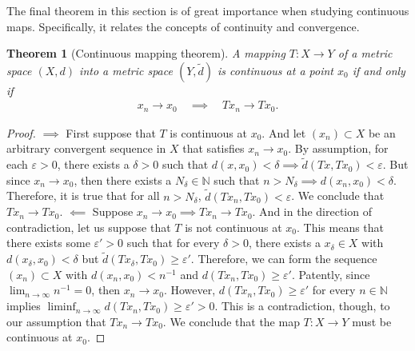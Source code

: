 \documentclass[11pt]{article}
\theoremstyle{mystyle}
\newtheorem{thm}{Theorem}[section]
\begin{document}
The final theorem in this section is of great importance when studying continuous maps. Specifically, it relates the concepts of continuity and convergence.
\begin{thm}[Continuous mapping theorem]\label{continuousmapping}
A mapping $T: X \longrightarrow Y$ of a metric space $(X, d)$ into a metric space $(Y, \tilde{d})$ is continuous at a point $x_0$ if and only if
\begin{align*}
    x_n \longrightarrow x_0 \quad \implies \quad Tx_n \longrightarrow Tx_0.
\end{align*}
\end{thm}
\begin{proof}
$\implies$ First suppose that $T$ is continuous at $x_0$. And let $(x_n) \subset X$ be an arbitrary convergent sequence in $X$ that satisfies $x_n \longrightarrow x_0$. By assumption, for each $\varepsilon > 0$, there exists a $\delta > 0$ such that $d(x, x_0) < \delta \implies \tilde{d}(Tx, Tx_0) < \varepsilon$. But since $x_n \longrightarrow x_0$, then there exists a $N_{\delta} \in \mathbb{N}$ such that $n > N_{\delta} \implies d(x_n, x_0) < \delta$. Therefore, it is true that for all $n > N_{\delta}$, $\tilde{d}(Tx_n, Tx_0) < \varepsilon$. We conclude that $Tx_n \longrightarrow Tx_0$.\newline
$\impliedby$ Suppose $x_n \longrightarrow x_0 \implies Tx_n \longrightarrow Tx_0$. And in the direction of contradiction, let us suppose that $T$ is not continuous at $x_0$. This means that there exists some $\varepsilon' > 0$ such that for every $\delta > 0$, there exists a $x_{\delta} \in X$ with $d(x_{\delta}, x_0) < \delta$ but $\tilde{d}(Tx_{\delta},Tx_0) \geq \varepsilon'$. Therefore, we can form the sequence $(x_n) \subset X$ with $d(x_n, x_0) < n^{-1}$ and $d(Tx_n, Tx_0) \geq \varepsilon'$. Patently, since $\lim_{n \to \infty} n^{-1} = 0$, then $x_n \longrightarrow x_0$. However, $d(Tx_n, Tx_0) \geq \varepsilon'$ for every $n \in \mathbb{N}$ implies $\liminf_{n \to \infty} d(Tx_n, Tx_0) \geq \varepsilon' > 0$. This is a contradiction, though, to our assumption that $Tx_n \longrightarrow Tx_0$. We conclude that the map $T: X \longrightarrow Y$ must be continuous at $x_0$.
\end{proof}
\end{document}
